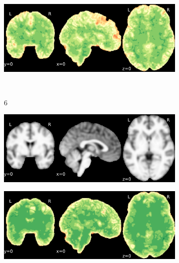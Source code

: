 \documentclass{article}
\begin{document}
\begin{landscape}
\begin{figure}
\begin{subfigure}[t]{0.2\paperheight}
        \end{subfigure}
        \begin{subfigure}[t]{0.2\paperheight}
            \centering
            \includegraphics[width=\textwidth]{figures/sig/fwhm_5/rr.rs_ds001748_sub-adult15_sig.pdf}
        \end{subfigure} \\
        \begin{subfigure}[b][][c]{0.01\paperwidth} 6 \vspace*{15pt} \end{subfigure}
        \begin{subfigure}[t]{0.2\paperheight}
            \centering
            \includegraphics[width=\textwidth]{figures/ieee_T1/fwhm_5/ieee_ds001748_sub-adult16.pdf}
        \end{subfigure}
        \begin{subfigure}[t]{0.2\paperheight}
            \centering
            \includegraphics[width=\textwidth]{figures/sig/fwhm_5/rr_ds001748_sub-adult16_sig.pdf}

\end{subfigure}
\end{figure}
\end{landscape}
\end{document}
